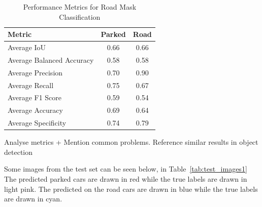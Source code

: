 \begin{table}[htbp]
    \centering
    \begin{tabular}{|l|c|c|}
    \hline
    \textbf{Metric}               & \textbf{Parked} & \textbf{Road} \\ \hline
    Average IoU                  & 0.66         & 0.66              \\ \hline
    Average Balanced Accuracy    & 0.58         & 0.58              \\ \hline
    Average Precision            & 0.70         & 0.90              \\ \hline
    Average Recall               & 0.75         & 0.67              \\ \hline
    Average F1 Score             & 0.59         & 0.54              \\ \hline
    Average Accuracy             & 0.69         & 0.64              \\ \hline
    Average Specificity          & 0.74         & 0.79              \\ \hline
    \end{tabular}
    \caption{Performance Metrics for Road Mask Classification}
    \label{tab:metrics1}
\end{table}

Analyse metrics + Mention common problems. Reference similar results in object detection

Some images from the test set can be seen below, in Table~\ref{tab:test_images1}
The predicted parked cars are drawn in red while the true labels are drawn in light pink. The predicted on the road cars are drawn in blue while the true labels are drawn in cyan.

